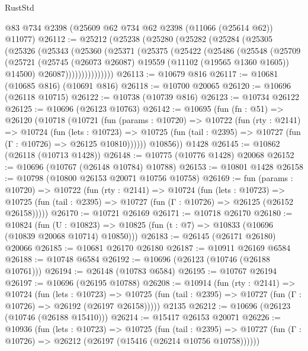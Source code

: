 \begin{lexlean}{RustStd}
\begin{coremodule}
    @83
    @734
    @2398
    (@25609 @62 @734 @62 @2398 (@11066 (@25614 @62)) @11077)
@26112 := @25212
    (@25238
      (@25280
        (@25282
          (@25284
            (@25305
              (@25326
                (@25343
                  (@25360
                    (@25371
                      (@25375
                        (@25422
                          (@25486
                            (@25548
                              (@25709
                                (@25721
                                  (@25745
                                    (@26073 @26087)
                                    @19559
                                    (@11102 (@19565 @1360 @1605))
                                    @14500)
                                  @26087)))))))))))))))
@26113 := @10679 @816
@26117 := @10681 (@10685 @816) (@10691 @816)
@26118 := @10700 @20065
@26120 := @10696 (@26118 @10715)
@26122 := @10738 (@10739 @816)
@26123 := @10734 @26122
@26125 := @10696 (@26123 @10763)
@26142 := @10695
    (fun (fn : @51) =>
    @26120
      (@10718
        (@10721
          (fun (params : @10720) =>
          @10722
            (fun (rty : @2141) =>
            @10724
              (fun (lets : @10723) =>
              @10725 (fun (tail : @2395) => @10727 (fun (Γ : @10726) => @26125 @10810))))))
        @10856))
    @1428
@26145 := @10862 (@26118 (@10713 @1428))
@26148 := @10775 (@10776 @1428) @20068
@26152 := @10696 (@10767 (@26148 @10784) @10788)
@26153 := @10801 @1428
@26158 := @10798 (@10800 @26153 @20071 @10756 @10758)
@26169 := fun (params : @10720) =>
  @10722
    (fun (rty : @2141) =>
    @10724
      (fun (lets : @10723) =>
      @10725 (fun (tail : @2395) => @10727 (fun (Γ : @10726) => @26125 (@26152 @26158)))))
@26170 := @10721 @26169
@26171 := @10718 @26170
@26180 := @10824
    (fun (U : @10823) => @10825 (fun (t : @7) => @10833 (@10696 (@10839 @20068 @10714) @10850)))
@26183 := @26145 (@26171 @26180) @20066
@26185 := @10681 @26170 @26180
@26187 := @10911 @26169 @6584
@26188 := @10748 @6584
@26192 := @10696 (@26123 (@10746 (@26188 @10761)))
@26194 := @26148 (@10783 @6584)
@26195 := @10767 @26194
@26197 := @10696 (@26195 @10788)
@26208 := @10914
    (fun (rty : @2141) =>
    @10724
      (fun (lets : @10723) =>
      @10725 (fun (tail : @2395) => @10727 (fun (Γ : @10726) => @26192 (@26197 @26158)))))
    @2135
@26212 := @10696 (@26123 (@10746 (@26188 @15410)))
@26214 := @15417 @26153 @20071
@26226 := @10936
    (fun (lets : @10723) =>
    @10725
      (fun (tail : @2395) =>
      @10727 (fun (Γ : @10726) => @26212 (@26197 (@15416 (@26214 @10756 @10758))))))

\end{coremodule}
\end{lexlean}
